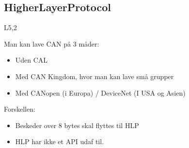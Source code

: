 \documentclass[oneside, 10pt]{article}
\begin{document}
\subsection{HigherLayerProtocol}
L5,2


Man kan lave CAN på 3 måder:
\begin{itemize}
	\item Uden CAL
	\item Med CAN Kingdom, hvor man kan lave små grupper
	\item Med CANopen (i Europa) / DeviceNet (I USA og Asien)
\end{itemize}

Forskellen:
\begin{itemize}
	\item Beskeder over 8 bytes skal flyttes til HLP
	\item HLP har ikke et API udaf til.
\end{itemize}






\newpage
\end{document}
